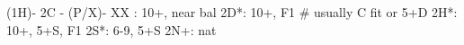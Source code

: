 (1H)- 2C - (P/X)- 
XX : 10+, near bal
2D*: 10+, F1  # usually C fit or 5+D
2H*: 10+, 5+S, F1
2S*: 6-9, 5+S
2N+: nat